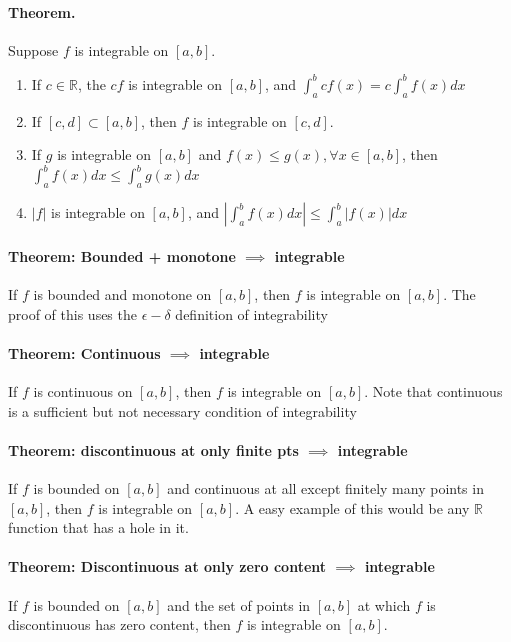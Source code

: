 \documentclass[11pt]{article}
\begin{document}
\paragraph{Theorem.} Suppose $f$ is integrable on $[a,b]$.
\begin{enumerate}
    \item If $c\in \mathbb{R}$, the $cf$ is integrable on $[a,b]$, and $\int_a^b cf(x) = c\int_a^bf(x)dx$
    \item If $[c,d] \subset [a,b]$, then $f$ is integrable on $[c,d]$.
    \item If $g$ is integrable on $[a,b]$ and $f(x) \leq g(x),\forall x \in [a,b]$, then $\int_a^b f(x)dx\leq \int_a^b g(x)dx$
    \item $|f|$ is integrable on $[a,b]$, and $\left|\int_a^bf(x)dx\right| \leq \int_a^b |f(x)|dx$
\end{enumerate}

\paragraph{Theorem: Bounded + monotone $\implies$ integrable} If $f$ is bounded and monotone on $[a,b]$, then $f$ is integrable on $[a,b]$. The proof of this uses the $\epsilon-\delta$ definition of integrability

\paragraph{Theorem: Continuous $\implies$ integrable} If $f$ is continuous on $[a,b]$, then $f$ is integrable on $[a,b]$. Note that continuous is a sufficient but not necessary condition of integrability

\paragraph{Theorem: discontinuous at only finite pts $\implies$ integrable} If $f$ is bounded on $[a,b]$ and continuous at all except finitely many points in $[a,b]$, then $f$ is integrable on $[a,b]$. A easy example of this would be any $\mathbb{R}$ function that has a hole in it.

\paragraph{Theorem: Discontinuous at only zero content $\implies$ integrable} If $f$ is bounded on $[a,b]$ and the set of points in $[a,b]$ at which $f$ is discontinuous has zero content, then $f$ is integrable on $[a,b]$.
\end{document}
